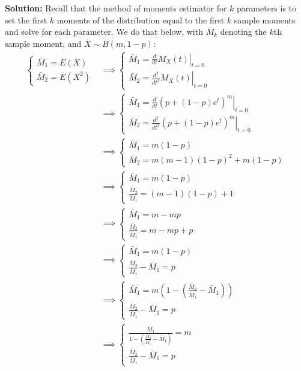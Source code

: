 \documentclass{article}
\begin{document}
\noindent\textbf{Solution:} Recall that the method of moments estimator for $k$ parameters is to set the first $k$ moments of the distribution equal to the first $k$ sample moments and solve for each parameter. We do that below, with $\bar M_k$ denoting the $k$th sample moment, and $X\sim B(m,1-p)$:
\begin{align*}
    \begin{cases}
        \bar M_1=E(X)\\
        \bar M_2=E(X^2)
    \end{cases}
    &\implies
    \begin{cases}
        \bar M_1=\left.\frac{d}{dt}M_X(t)\right|_{t=0}\\
        \bar M_2=\left.\frac{d^2}{dt^2}M_X(t)\right|_{t=0}
    \end{cases}\tag{$k$th moment given by mgf}\\
    &\implies
    \begin{cases}
        \bar M_1=\left.\frac{d}{dt}(p+(1-p)e^t)^m\right|_{t=0}\\
        \bar M_2=\left.\frac{d^2}{dt^2}(p+(1-p)e^t)^m\right|_{t=0}
    \end{cases}\tag{mgf of binomial RV}\\
    &\implies
    \begin{cases}
        \bar M_1=m(1-p)\\
        \bar M_2=m(m-1)(1-p)^2+m(1-p)
    \end{cases}\\
    &\implies
    \begin{cases}
        \bar M_1=m(1-p)\\
        \frac{\bar M_2}{\bar M_1}=(m-1)(1-p)+1
    \end{cases}\\
    &\implies
    \begin{cases}
        \bar M_1=m-mp\\
        \frac{\bar M_2}{\bar M_1}=m-mp+p
    \end{cases}\\
    &\implies
    \begin{cases}
        \bar M_1=m(1-p)\\
        \frac{\bar M_2}{\bar M_1}-\bar M_1=p
    \end{cases}\\
    &\implies
    \begin{cases}
        \bar M_1=m\left(1-\left(\frac{\bar M_2}{\bar M_1}-\bar M_1\right)\right)\\
        \frac{\bar M_2}{\bar M_1}-\bar M_1=p
    \end{cases}\\
    &\implies
    \begin{cases}
        \frac{\bar M_1}{1-\left(\frac{\bar M_2}{\bar M_1}-\bar M_1\right)}=m\\
        \frac{\bar M_2}{\bar M_1}-\bar M_1=p
    \end{cases}
\end{align*}
\end{document}
